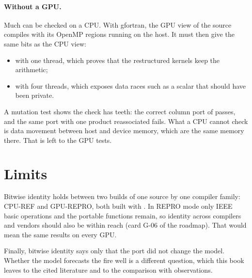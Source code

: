 \paragraph{Without a GPU.} Much can be checked on a CPU. With gfortran, the GPU view of the source compiles with its
OpenMP  regions running on the host. It must then give the same bits as the CPU view:
\begin{itemize}
  \item with one thread, which proves that the restructured kernels keep the arithmetic;
  \item with four threads, which exposes data races such as a scalar that should have been private.
\end{itemize}
A mutation test shows the check has teeth: the correct column port of  passes, and the same port
with one product reassociated fails. What a CPU cannot check is data movement between host and device memory, which
are the same memory there. That is left to the GPU tests.

\section{Limits}

Bitwise identity holds between two builds of one source by one compiler family: CPU-REF and GPU-REPRO, both built
with . In REPRO mode only IEEE basic operations and the portable functions remain, so identity across
compilers and vendors should also be within reach (card G-06 of the roadmap). That would mean the same results on
every GPU.

Finally, bitwise identity says only that the port did not change the model. Whether the model forecasts the fire
well is a different question, which this book leaves to the cited literature and to the comparison with
observations.
